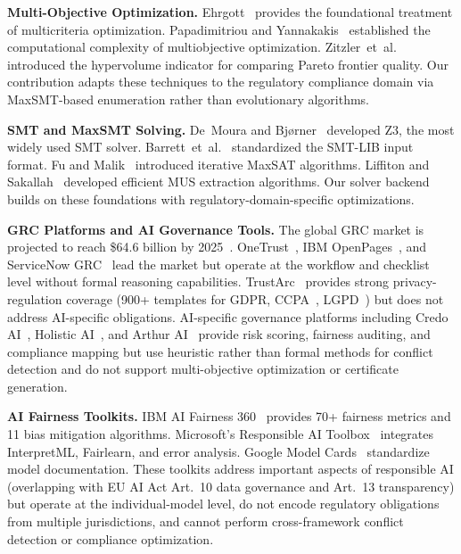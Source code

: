 \documentclass[11pt,twocolumn]{article}
\begin{document}
\textbf{Multi-Objective Optimization.}
Ehrgott~\cite{ehrgott2005} provides the foundational treatment of multicriteria
optimization. Papadimitriou and Yannakakis~\cite{papadimitriou2000} established
the computational complexity of multiobjective optimization.
Zitzler~et~al.~\cite{zitzler1999hypervolume} introduced the hypervolume indicator for
comparing Pareto frontier quality. Our contribution adapts these techniques to
the regulatory compliance domain via MaxSMT-based enumeration rather than
evolutionary algorithms.

\textbf{SMT and MaxSMT Solving.}
De~Moura and Bj{\o}rner~\cite{demoura2008z3} developed Z3, the most widely used
SMT solver. Barrett~et~al.~\cite{barrett2010smtlib} standardized the SMT-LIB
input format. Fu and Malik~\cite{fumalik2006} introduced iterative MaxSAT
algorithms. Liffiton and Sakallah~\cite{liffiton2008mus} developed efficient
MUS extraction algorithms. Our solver backend builds on these foundations
with regulatory-domain-specific optimizations.

\textbf{GRC Platforms and AI Governance Tools.}
The global GRC market is projected to reach \$64.6 billion by 2025~\cite{grcmarket2024}.
OneTrust~\cite{onetrust2024}, IBM OpenPages~\cite{ibmopenpages2024}, and
ServiceNow GRC~\cite{servicenow2024} lead the market but operate at the workflow
and checklist level without formal reasoning capabilities. TrustArc~\cite{trustarc2024}
provides strong privacy-regulation coverage (900+ templates for GDPR,
CCPA~\cite{ccpa2018}, LGPD~\cite{brazillgpd}) but does not address AI-specific
obligations. AI-specific governance platforms including
Credo AI~\cite{credoai2024}, Holistic AI~\cite{holisticai2024}, and
Arthur AI~\cite{arthurai2024} provide risk scoring, fairness auditing, and
compliance mapping but use heuristic rather than formal methods for conflict
detection and do not support multi-objective optimization or certificate
generation.

\textbf{AI Fairness Toolkits.}
IBM AI Fairness 360~\cite{ibmaif360} provides 70+ fairness metrics and 11 bias
mitigation algorithms. Microsoft's Responsible AI Toolbox~\cite{msrai2023}
integrates InterpretML, Fairlearn, and error analysis. Google Model
Cards~\cite{googlemodelcards} standardize model documentation. These toolkits
address important aspects of responsible AI (overlapping with EU AI Act Art.~10
data governance and Art.~13 transparency) but operate at the individual-model
level, do not encode regulatory obligations from multiple jurisdictions, and
cannot perform cross-framework conflict detection or compliance optimization.
\end{document}
